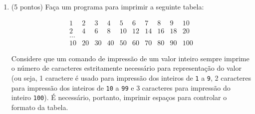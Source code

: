 \documentclass[brazil]{article}
\begin{document}
\begin{enumerate}
Fa\c{c}a um programa que leia repetidamente duas cadeias de caracteres
que representam n\'umeros de ponto flutuante, at\'e que um deles seja
menor ou igual a zero, e chame a fun\c{c}\~ao acima para cada par de
valores positivos lidos, imprimindo o resultado calculado pela
fun\c{c}\~ao. Em cada caso, o primeiro valor lido deve definir o valor
de $r$ (radioatividade inicial do material) e o segundo valor lido
deve definir o valor de $\mathit{min}$ (limite m\'{\i}nimo de
radioatividade).

Nota 2: Voc\^e pode supor que a cadeia de caracteres lida representa
um valor de ponto flutuante (n\~ao precisa tratar o caso em que a
cadeia lida n\~ao representa um valor de ponto flutuante).

\item (5 pontos) Fa\c{c}a um programa para imprimir a seguinte tabela:

 \[ \begin{array}{llllllllll}
      1 & 2 & 3 & 4 & 5 & 6 & 7 & 8 & 9 & 10\\
      2 & 4 & 6 & 8 & 10 & 12 & 14 & 16 & 18 & 20\\
      \ldots\\
      10 & 20 & 30 & 40 & 50 & 60 & 70 & 80 & 90 & 100
    \end{array}
  \]

Considere que um comando de impress\~ao de um valor inteiro sempre
imprime o n\'umero de caracteres estritamente necess\'ario para
representa\c{c}\~ao do valor (ou seja, 1 caractere \'e usado para
impress\~ao dos inteiros de {\tt 1} a {\tt 9}, 2 caracteres para
impress\~ao dos inteiros de {\tt 10} a {\tt 99} e 3 caracteres para
impress\~ao do inteiro {\tt 100}). \'E necess\'ario, portanto,
imprimir espa\c{c}os para controlar o formato da tabela.

\end{enumerate}
\end{document}
